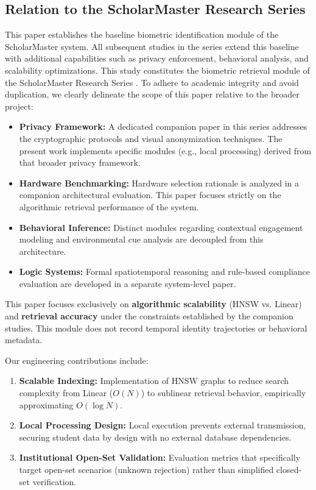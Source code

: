 \documentclass[conference]{IEEEtran}
\begin{document}
\subsection{Relation to the ScholarMaster Research Series}
This paper establishes the baseline biometric identification module of the ScholarMaster system. All subsequent studies in the series extend this baseline with additional capabilities such as privacy enforcement, behavioral analysis, and scalability optimizations. This study constitutes the biometric retrieval module of the ScholarMaster Research Series \cite{scholarmaster_repo}. To adhere to academic integrity and avoid duplication, we clearly delineate the scope of this paper relative to the broader project:
\begin{itemize}
    \item \textbf{Privacy Framework:} A dedicated companion paper in this series addresses the cryptographic protocols and visual anonymization techniques. The present work implements specific modules (e.g., local processing) derived from that broader privacy framework.
    \item \textbf{Hardware Benchmarking:} Hardware selection rationale is analyzed in a companion architectural evaluation. This paper focuses strictly on the algorithmic retrieval performance of the system.
    \item \textbf{Behavioral Inference:} Distinct modules regarding contextual engagement modeling and environmental cue analysis are decoupled from this architecture.
    \item \textbf{Logic Systems:} Formal spatiotemporal reasoning and rule-based compliance evaluation are developed in a separate system-level paper.
\end{itemize}
This paper focuses exclusively on \textbf{algorithmic scalability} (HNSW vs. Linear) and \textbf{retrieval accuracy} under the constraints established by the companion studies. This module does not record temporal identity trajectories or behavioral metadata.

Our engineering contributions include:
\begin{enumerate}
    \item \textbf{Scalable Indexing:} Implementation of HNSW graphs to reduce search complexity from Linear ($O(N)$) to sublinear retrieval behavior, empirically approximating $O(\log N)$.
    \item \textbf{Local Processing Design:} Local execution prevents external transmission, securing student data by design with no external database dependencies.
    \item \textbf{Institutional Open-Set Validation:} Evaluation metrics that specifically target open-set scenarios (unknown rejection) rather than simplified closed-set verification.
\end{enumerate}
\end{document}
